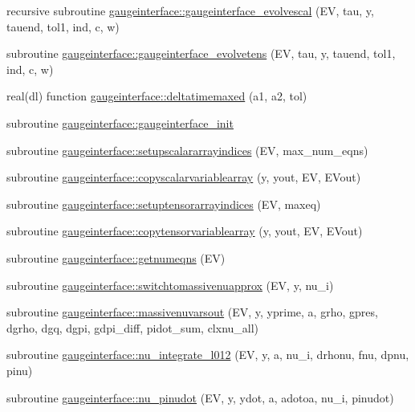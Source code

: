 \begin{DoxyCompactItemize}
\item 
recursive subroutine \mbox{\hyperlink{namespacegaugeinterface_a11f5c8bd6a22537e4a85362dc8dbf3af}{gaugeinterface\+::gaugeinterface\+\_\+evolvescal}} (EV, tau, y, tauend, tol1, ind, c, w)
\item 
subroutine \mbox{\hyperlink{namespacegaugeinterface_a048447959e15ae6dd9e887a61e135d0c}{gaugeinterface\+::gaugeinterface\+\_\+evolvetens}} (EV, tau, y, tauend, tol1, ind, c, w)
\item 
real(dl) function \mbox{\hyperlink{namespacegaugeinterface_aaf1e4804f8b140406e78f53f199433fa}{gaugeinterface\+::deltatimemaxed}} (a1, a2, tol)
\item 
subroutine \mbox{\hyperlink{namespacegaugeinterface_a59182efb978c657918dd88675b2ab0ef}{gaugeinterface\+::gaugeinterface\+\_\+init}}
\item 
subroutine \mbox{\hyperlink{namespacegaugeinterface_a50a72debb65475527ccc7e76af616083}{gaugeinterface\+::setupscalararrayindices}} (EV, max\+\_\+num\+\_\+eqns)
\item 
subroutine \mbox{\hyperlink{namespacegaugeinterface_a8565dc876beb9e4339c005a72333f31f}{gaugeinterface\+::copyscalarvariablearray}} (y, yout, EV, E\+Vout)
\item 
subroutine \mbox{\hyperlink{namespacegaugeinterface_a21f6d1e93445d43fc8247f57dce52716}{gaugeinterface\+::setuptensorarrayindices}} (EV, maxeq)
\item 
subroutine \mbox{\hyperlink{namespacegaugeinterface_ab306d2378bd6f559471a11afc145621c}{gaugeinterface\+::copytensorvariablearray}} (y, yout, EV, E\+Vout)
\item 
subroutine \mbox{\hyperlink{namespacegaugeinterface_ad273d68dadb4d4fcc10422fed213ca25}{gaugeinterface\+::getnumeqns}} (EV)
\item 
subroutine \mbox{\hyperlink{namespacegaugeinterface_ac7f67b6e2bc871b4eb1a6d3453f796a3}{gaugeinterface\+::switchtomassivenuapprox}} (EV, y, nu\+\_\+i)
\item 
subroutine \mbox{\hyperlink{namespacegaugeinterface_ac756539212eaeba8021159b26d1d2881}{gaugeinterface\+::massivenuvarsout}} (EV, y, yprime, a, grho, gpres, dgrho, dgq, dgpi, gdpi\+\_\+diff, pidot\+\_\+sum, clxnu\+\_\+all)
\item 
subroutine \mbox{\hyperlink{namespacegaugeinterface_aaf5da349a1adc87f4c62f51f1e0c0371}{gaugeinterface\+::nu\+\_\+integrate\+\_\+l012}} (EV, y, a, nu\+\_\+i, drhonu, fnu, dpnu, pinu)
\item 
subroutine \mbox{\hyperlink{namespacegaugeinterface_acba44d8f8f824999640418908be29b9b}{gaugeinterface\+::nu\+\_\+pinudot}} (EV, y, ydot, a, adotoa, nu\+\_\+i, pinudot)

\end{DoxyCompactItemize}
